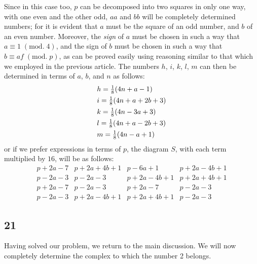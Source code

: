 \documentclass[twoside,12pt]{memoir}
\renewcommand{\pmod}[1]{\;(\textrm{mod.}\;#1)}
\let\oldfrac\frac
\def\frac#1#2{\mathchoice{\tfrac{#1}{#2}}{\oldfrac{#1}{#2}}{\genfrac{}{}{}{2}{#1}{#2\mathstrut}}{\genfrac{}{}{}{3}{#1}{#2\mathstrut}}}
\begin{document}
Since in this case too, \(p\) can be decomposed into two squares in only one way, with one even and the other odd, \(a a\) and \(b b\) will be completely determined numbers; for it is evident that \(a\) must be the square of an odd number, and \(b\) of an even number. Moreover, the \textit{sign} of \(a\) must be chosen in such a way that \(a \equiv 1\pmod{4}\), and the sign of \(b\) must be chosen in such a way that \(b \equiv af\pmod{p}\), as can be proved easily using reasoning similar to that which we employed in the previous article.
%
The numbers \(h\), \(i\), \(k\), \(l\), \(m\) can then be determined in terms of \(a\), \(b\), and \(n\) as follows:
\[\begin{aligned}
&h = \frac{1}{8}(4n + a - 1) \\
&i = \frac{1}{8}(4n + a + 2b + 3) \\
&k = \frac{1}{8}(4n - 3a + 3) \\
&l = \frac{1}{8}(4n + a - 2b + 3) \\
&m = \frac{1}{8}(4n - a + 1)
\end{aligned}\]
or if we prefer expressions in terms of \(p\), the diagram \(S\), with each term multiplied by \(16\), will be as follows:
\[\begin{array}{l|l|l|l}
p+2a-7 & p+2a+4b+1 & p-6a+1 & p+2a-4b+1 \\
p-2a-3 & p-2a-3 & p+2a-4b+1 & p+2a+4b+1 \\
p+2a-7 & p-2a-3 & p+2a-7 & p-2a-3 \\
p-2a-3 & p+2a-4b+1 & p+2a+4b+1 & p-2a-3
\end{array}\]
%

\subsection*{21}

Having solved our problem, we return to the main discussion.  We will now completely determine the complex to which the number 2 belongs.
\end{document}
